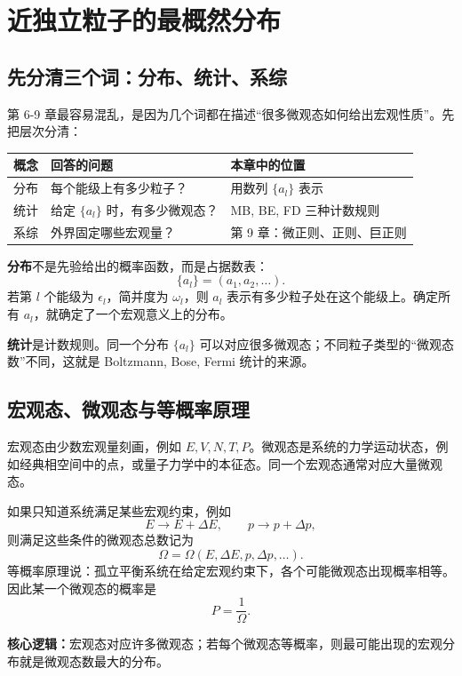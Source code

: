\chapter{近独立粒子的最概然分布}

\section{先分清三个词：分布、统计、系综}

第 6-9 章最容易混乱，是因为几个词都在描述“很多微观态如何给出宏观性质”。先把层次分清：
\begin{center}
\small
\begin{tabular}{p{} p{} p{}}
\toprule
概念 & 回答的问题 & 本章中的位置 \\
\midrule
分布 & 每个能级上有多少粒子？ & 用数列 $\{a_l\}$ 表示 \\
统计 & 给定 $\{a_l\}$ 时，有多少微观态？ & MB, BE, FD 三种计数规则 \\
系综 & 外界固定哪些宏观量？ & 第 9 章：微正则、正则、巨正则 \\
\bottomrule
\end{tabular}
\end{center}

\textbf{分布}不是先验给出的概率函数，而是占据数表：
\[
  \{a_l\}=(a_1,a_2,\ldots).
\]
若第 $l$ 个能级为 $\epsilon_l$，简并度为 $\omega_l$，则 $a_l$ 表示有多少粒子处在这个能级上。确定所有 $a_l$，就确定了一个宏观意义上的分布。

\textbf{统计}是计数规则。同一个分布 $\{a_l\}$ 可以对应很多微观态；不同粒子类型的“微观态数”不同，这就是 Boltzmann, Bose, Fermi 统计的来源。

\section{宏观态、微观态与等概率原理}

宏观态由少数宏观量刻画，例如 $E,V,N,T,P$。微观态是系统的力学运动状态，例如经典相空间中的点，或量子力学中的本征态。同一个宏观态通常对应大量微观态。

如果只知道系统满足某些宏观约束，例如
\[
  E\to E+\Delta E,\qquad p\to p+\Delta p,
\]
则满足这些条件的微观态总数记为
\[
  \Omega=\Omega(E,\Delta E,p,\Delta p,\ldots).
\]
等概率原理说：孤立平衡系统在给定宏观约束下，各个可能微观态出现概率相等。因此某一个微观态的概率是
\[
  P=\frac{1}{\Omega}.
\]

\begin{keybox}
\textbf{核心逻辑：}宏观态对应许多微观态；若每个微观态等概率，则最可能出现的宏观分布就是微观态数最大的分布。
\end{keybox}

